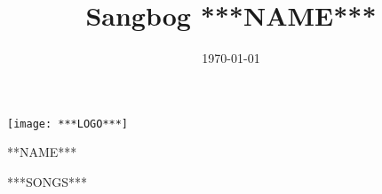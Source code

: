 \documentclass[pdftex, twoside]{article}
\title{Sangbog ***NAME*** \the\year}
\date{\today}
\begin{document}

\thispagestyle{empty}
\centering
\phantom{test}
\vspace{1cm}
\mbox{\texttt{[image: ***LOGO***]}}
\vspace{1cm}
\begin{center}
\selectfont\Huge ***NAME*** \the\year
\end{center}
\vspace{2.5cm}
\newpage
\setcounter{page}{0}
\raggedright
{}

\begin{songs}{}
\setcounter{songnum}{0}

***SONGS***

\end{songs}
\end{document}
